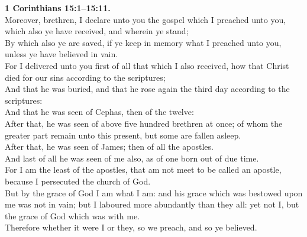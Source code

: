 \documentclass[10pt]{article} %
\begin{document}
{\begin{minipage}[t]{0.45\textwidth}
\textbf{1 Corinthians 15:1--15:11.}\\
Moreover, brethren, I declare unto you the gospel which I preached unto you, which also ye have received, and wherein ye stand;\\
By which also ye are saved, if ye keep in memory what I preached unto you, unless ye have believed in vain.\\
For I delivered unto you first of all that which I also received, how that Christ died for our sins according to the scriptures;\\
And that he was buried, and that he rose again the third day according to the scriptures:\\
And that he was seen of Cephas, then of the twelve:\\
After that, he was seen of above five hundred brethren at once; of whom the greater part remain unto this present, but some are fallen asleep.\\
After that, he was seen of James; then of all the apostles.\\
And last of all he was seen of me also, as of one born out of due time.\\
For I am the least of the apostles, that am not meet to be called an apostle, because I persecuted the church of God.\\
But by the grace of God I am what I am: and his grace which was bestowed upon me was not in vain; but I laboured more abundantly than they all: yet not I, but the grace of God which was with me.\\
Therefore whether it were I or they, so we preach, and so ye believed.\\

\end{minipage}}
\vspace*{\fill}
\newpage
\Huge%
\vspace*{\fill}
\end{document}
